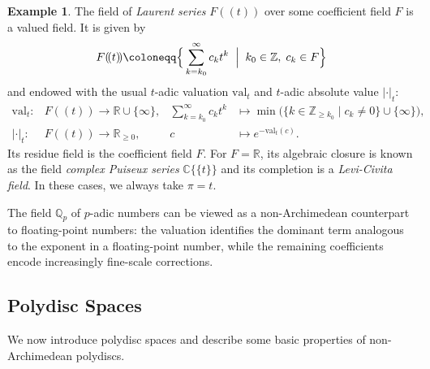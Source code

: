 \documentclass[10pt]{article}
\theoremstyle{definition}
\newtheorem{example}[theorem]{Example}
\newcommand{\CC}{\mathbb{C}}
\newcommand{\RR}{\mathbb{R}}
\newcommand{\ZZ}{\mathbb{Z}}
\newcommand{\QQ}{\mathbb{Q}}
\newcommand{\suchthat}{\;\ifnum\currentgrouptype=16 \middle\fi|\;}
\newcommand{\bigmid}{\left.\vphantom{\Big\{} \suchthat \vphantom{\Big\}}\right.}
\newcommand{\val}{{\mathrm{val}}}
\begin{document}
\begin{example}
  \label{ex:LaurentSeries}
  The field of \emph{Laurent series} $F(\!(t)\!)$ over some coefficient field $F$ is a valued field.  It is given by
    \begin{equation*}
    F(\!(t)\!)\coloneqq\Big\{\sum_{k=k_0}^\infty c_k t^k \bigmid k_0\in\ZZ,\; c_k\in F \Big\}
  \end{equation*}
  and endowed with the usual $t$-adic valuation $\val_t$ and $t$-adic absolute value $|\cdot|_t$:
  \begin{align*}
    \val_t\colon &F(\!(t)\!)\rightarrow \RR\cup\{\infty\}, & \sum_{k=k_0}^\infty c_k t^k&\mapsto \min\Big(\{k\in\ZZ_{\geq k_0}\mid c_k\neq 0\}\cup\{\infty\}\Big),\\
    |\cdot|_t\colon&F(\!(t)\!) \rightarrow \RR_{\geq 0}, & c&\mapsto e^{-\val_t(c)}.
  \end{align*}
  Its residue field is the coefficient field $F$.  For $F=\RR$, its algebraic closure is known as the field \emph{complex Puiseux series} $\CC\{\!\{t\}\!\}$ and its completion is a \emph{Levi-Civita field}. In these cases, we always take $\pi = t$.
\end{example}

The field $\QQ_p$ of $p$-adic numbers can be viewed as a non-Archimedean counterpart to floating-point numbers: the valuation identifies the dominant term analogous to the exponent in a floating-point number, while the remaining coefficients encode increasingly fine-scale corrections.

\subsection{Polydisc Spaces}

We now introduce polydisc spaces and describe some basic properties of non-Archimedean polydiscs.
\end{document}
